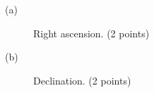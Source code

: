 \begin{description}
\item[(a)] Right ascension. \hfill(2 points)
\item[(b)] Declination. \hfill(2 points)
\end{description}
